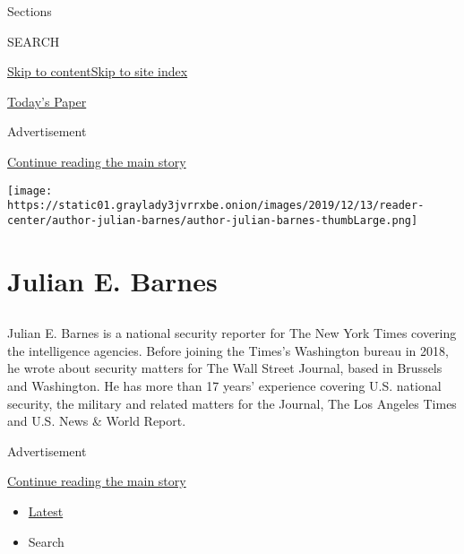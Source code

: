 Sections

SEARCH

\protect\hyperlink{site-content}{Skip to
content}\protect\hyperlink{site-index}{Skip to site index}

\href{https://myaccount.nytimes3xbfgragh.onion/auth/login?response_type=cookie\&client_id=vi}{}

\href{https://www.nytimes3xbfgragh.onion/section/todayspaper}{Today's
Paper}

Advertisement

\protect\hyperlink{after-top}{Continue reading the main story}

\texttt{[image: https://static01.graylady3jvrrxbe.onion/images/2019/12/13/reader-center/author-julian-barnes/author-julian-barnes-thumbLarge.png]}

\hypertarget{julian-e-barnes}{%
\section{Julian E. Barnes}\label{julian-e-barnes}}

\hypertarget{section}{%
\subsection{}\label{section}}

Julian E. Barnes is a national security reporter for The New York Times
covering the intelligence agencies. Before joining the Times's
Washington bureau in 2018, he wrote about security matters for The Wall
Street Journal, based in Brussels and Washington. He has more than 17
years' experience covering U.S. national security, the military and
related matters for the Journal, The Los Angeles Times and U.S. News \&
World Report.

Advertisement

\protect\hyperlink{after-mid1}{Continue reading the main story}

\begin{itemize}
\tightlist
\item
  \protect\hyperlink{stream-panel}{Latest}
\item
  Search
\end{itemize}

